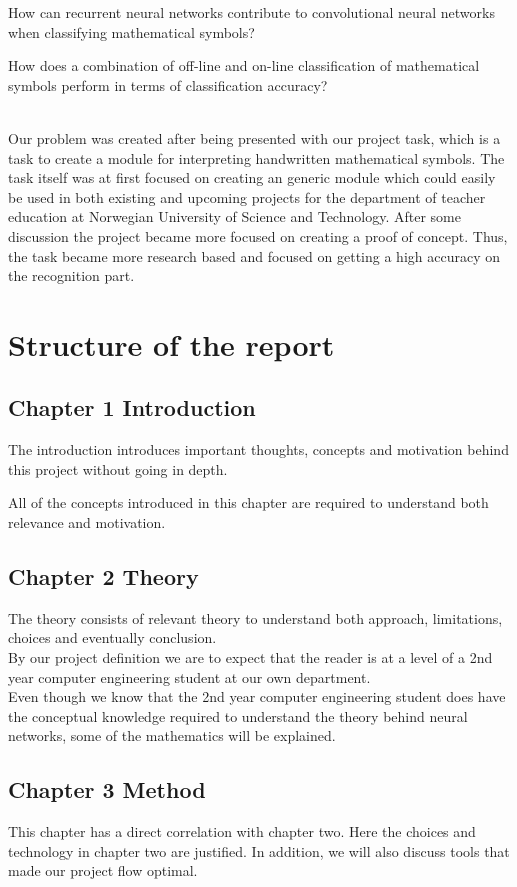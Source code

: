 How can recurrent neural networks contribute to convolutional neural networks when classifying mathematical symbols?

How does a combination of off-line and on-line classification of mathematical symbols perform in terms of classification accuracy?



\\ Our problem was created after being presented with our project task, which is a task to create a module for interpreting handwritten mathematical symbols. The task itself was at first focused on creating an generic module which could easily be used in both existing and upcoming projects for the department of teacher education at Norwegian University of Science and Technology. After some discussion the project became more focused on creating a proof of concept. Thus, the task became more research based and focused on getting a high accuracy on the recognition part. %


\section{Structure of the report}
\subsection{Chapter 1 Introduction}
The introduction introduces important thoughts, concepts and motivation behind this project without going in depth.

All of the concepts introduced in this chapter are required to understand both relevance and motivation.

\subsection{Chapter 2 Theory}
The theory consists of relevant theory to understand both approach, limitations, choices and eventually conclusion.\\
By our project definition we are to expect that the reader is at a level of a 2nd year computer engineering student at our own department. \\
Even though we know that the 2nd year computer engineering student does have the conceptual knowledge required to understand the theory behind neural networks, some of the mathematics will be explained.

\subsection{Chapter 3 Method}
This chapter has a direct correlation with chapter two. Here the choices and technology in chapter two are justified. 
In addition, we will also discuss tools that made our project flow optimal.


